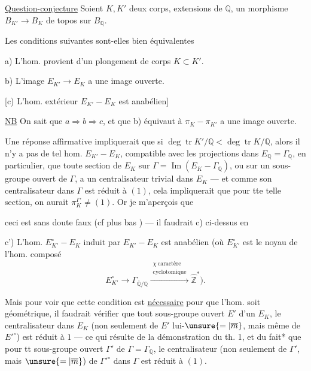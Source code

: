\uline{Question-conjecture} Soient $K,K'$ deux corps, extensions   de $\mathbb Q$,   un morphisme $B_{K'}\longrightarrow B_K$ de topos sur $B_{\mathbb Q}$.

Les conditions suivantes sont-elles bien équivalentes

a) L'hom. provient d'un plongement de corps $K\subset K'$.

b) L'image  $E_{K'}\longrightarrow E_K$ a une image ouverte.

[c) L'hom. extérieur $E_{K'}-E_K$ est anabélien]

\uline{NB} On sait que $a\Longrightarrow b\Longrightarrow c$, et que b) équivaut à $\pi_K-\pi_{K'}$ a une image ouverte.

Une réponse affirmative impliquerait que si $\deg\operatorname{tr}K'/\mathbb Q<\deg\operatorname{tr}K/\mathbb Q$, alors il n'y a pas de tel hom. $E_{K'}-E_K$, compatible avec les projections dans $E_{\mathbb Q}=\Gamma_{\mathbb Q}$, en particulier,   que  toute section de $E_K$ sur $\Gamma=\operatorname{Im}(E_K-\Gamma_{\mathbb Q})$, ou sur un sous-groupe ouvert  de $\Gamma$, a un centralisateur  trivial dans $E_K$ --- et comme son centralisateur dans $\Gamma$ est réduit à $(1)$, cela impliquerait que pour tte telle section, on aurait  $\pi_K^{\Gamma'}\ne(1)$. Or je m'aperçois que

ceci est sans doute faux (cf plus bas ) --- il faudrait    c) ci-dessus en

c') L'hom. $E_{K'}^\circ-E_K$ induit par $E_{K'}-E_K$ est anabélien (où $E_{K'}^\circ$ est le noyau de l'hom. composé
\[
E_{K'}^\circ\longrightarrow\Gamma_{\overline{\mathbb Q}/\mathbb Q}\xrightarrow{\substack{\chi\ \text{caractère}\\\text{cyclotomique}}}\widehat{\mathbb Z}^{*}).
\]

Mais pour voir que cette condition est \uline{nécessaire} pour que l'hom. soit géométrique, il faudrait  vérifier que  tout sous-groupe ouvert $E'$ d'un $E_K$, le centralisateur dans $E_K$ (non seulement de $E'$ lui-$\unsure{=|\overline m}$, mais même de $E'^\circ$) est réduit à $1$ --- ce qui résulte de la démonstration du th. 1, et du fait* que pour tt sous-groupe ouvert $\Gamma'$ de $\Gamma=\Gamma_{\mathbb Q}$, le centralisateur (non seulement de $\Gamma'$, mais $\unsure{=|\overline m}$) de $\Gamma'^\circ$ dans $\Gamma$ est réduit à $(1)$.

